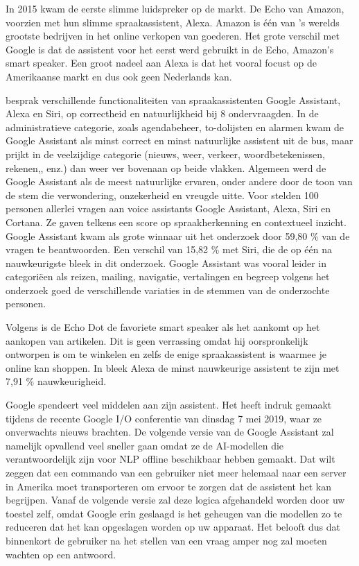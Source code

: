 In 2015 kwam de eerste slimme luidspreker op de markt. De Echo van Amazon, voorzien met hun slimme spraakassistent, Alexa. Amazon is één van 's werelds grootste bedrijven in het online verkopen van goederen. Het grote verschil met Google is dat de assistent voor het eerst werd gebruikt in de Echo, Amazon's smart speaker. Een groot nadeel aan Alexa is dat het vooral focust op de Amerikaanse markt en dus ook geen Nederlands kan.

\autocite{Lopez2018} besprak verschillende functionaliteiten van spraakassistenten Google Assistant, Alexa en Siri, op correctheid en natuurlijkheid bij 8 ondervraagden. In de administratieve categorie, zoals agendabeheer, to-dolijsten en alarmen kwam de Google Assistant als minst correct en minst natuurlijke assistent uit de bus, maar prijkt in de veelzijdige categorie (nieuws, weer, verkeer, woordbetekenissen, rekenen,, enz.) dan weer ver bovenaan op beide vlakken. Algemeen werd de Google Assistant als de meest natuurlijke ervaren, onder andere door de toon van de stem die verwondering, onzekerheid en vreugde uitte.
Voor \autocite{Tulshan2019} stelden 100 personen allerlei vragen aan voice assistants Google Assistant, Alexa, Siri en Cortana. Ze gaven telkens een score op spraakherkenning en contextueel inzicht. Google Assistant kwam als grote winnaar uit het onderzoek door 59,80 \% van de vragen te beantwoorden. Een verschil van 15,82 \% met Siri, die de op één na nauwkeurigste bleek in dit onderzoek. Google Assistant was vooral leider in categoriëen als reizen, mailing, navigatie, vertalingen en begreep volgens het onderzoek goed de verschillende variaties in de stemmen van de onderzochte personen.

Volgens \autocite{Lopez2018} is de Echo Dot de favoriete smart speaker als het aankomt op het aankopen van artikelen. Dit is geen verrassing omdat hij oorspronkelijk ontworpen is om te winkelen en zelfs de enige spraakassistent is waarmee je online kan shoppen. In \autocite{Tulshan2019} bleek Alexa de minst nauwkeurige assistent te zijn met 7,91 \% nauwkeurigheid.

Google spendeert veel middelen aan zijn assistent. Het heeft indruk gemaakt tijdens de recente Google I/O conferentie van dinsdag 7 mei 2019, waar ze onverwachts nieuws brachten. De volgende versie van de Google Assistant zal namelijk opvallend veel sneller gaan omdat ze de AI-modellen die verantwoordelijk zijn voor NLP offline beschikbaar hebben gemaakt. Dat wilt zeggen dat een commando van een gebruiker niet meer helemaal naar een server in Amerika moet transporteren om ervoor te zorgen dat de assistent het kan begrijpen. Vanaf de volgende versie zal deze logica afgehandeld worden door uw toestel zelf, omdat Google erin geslaagd is het geheugen van die modellen zo te reduceren dat het kan opgeslagen worden op uw apparaat. Het belooft dus dat binnenkort de gebruiker na het stellen van een vraag amper nog zal moeten wachten op een antwoord.

